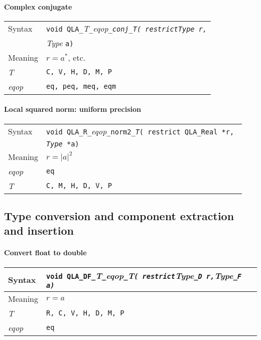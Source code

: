 \documentclass{article}
\newcommand{\tqlaReal}{QLA\ttdash Real }
\newcommand{\namespace}{QLA}
\newcommand{\allEqOps}{{\tt eq, peq, meq, eqm}}
\newcommand{\allComplexTypes}{{\tt C, M, H, D, V, P}}
\newcommand{\ttdash}{{\tt \_}}
\newcommand{\itt}{\it T}
\newcommand{\extraarg}{}
\newcommand{\protoUnarySingleTypesQual}[5]{{\tt void \namespace}\ttdash{\tt #1}\ttdash{\it eqop}\ttdash#2\ttdash{\tt #3}{\tt ( restrict #4 *r, }\\
  & {\tt #5 *a\extraarg)}}
\newcommand{\protoUnaryQual}[1]{{\tt void \namespace}\ttdash\itt\ttdash{\it eqop}\ttdash#1\ttdash\itt{\tt ( restrict}{\it Type }{\tt *r,}\\
 & {\it Type }{\tt *a\extraarg)}}
\begin{document}
\paragraph{Complex conjugate}

\begin{flushleft}
  \begin{tabular}{|l|l|}
  \hline
  Syntax      & \protoUnaryQual{\tt conj}  \\
  \hline
  Meaning     & $r = a^*$, etc. \\
  \hline
  \itt     & {\tt C, V, H, D, M, P} \\
  \hline
  {\it eqop}  & \allEqOps \\
  \hline
  \end{tabular}
\end{flushleft}

\paragraph{Local squared norm: uniform precision}

\begin{flushleft}
  \begin{tabular}{|l|l|}
  \hline
  Syntax      & \protoUnarySingleTypesQual{R}{\tt norm2}{\itt}{\tqlaReal}{{\it Type}} \\
  \hline
  Meaning     & $r = |a|^2$ \\
  \hline
  {\it eqop}  & {\tt eq} \\
  \hline
  \itt        & \allComplexTypes \\
  \hline
  \end{tabular}
\end{flushleft}

\subsection{Type conversion and component extraction and insertion}

\paragraph{Convert float to double}
\begin{flushleft}
  \begin{tabular}{|l|l|}
  \hline
  Syntax      & {\tt void \namespace}\ttdash {\tt DF}\ttdash\itt\ttdash{\it eqop}\ttdash\itt{\tt ( restrict}{\it Type}{\tt \_D }{\tt *r,}{\it Type}{\tt \_F }{\tt *a\extraarg)} \\
  \hline
  Meaning     & $r = a$ \\
  \hline
  \itt     & {\tt R, C, V, H, D, M, P} \\
  \hline
  {\it eqop}  & {\tt eq} \\
  \hline
  \end{tabular}
\end{flushleft}
\end{document}
